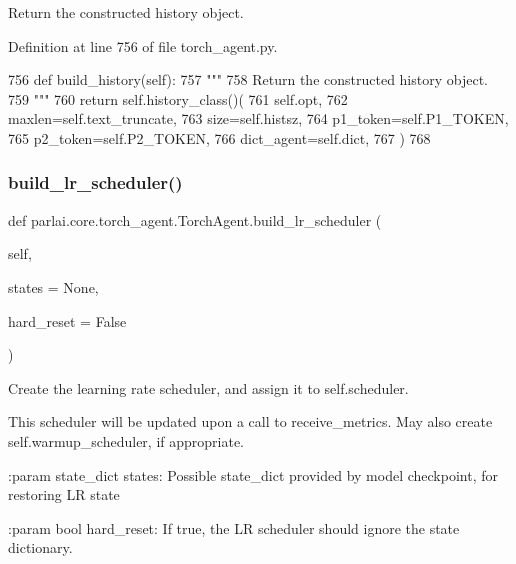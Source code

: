 \begin{DoxyVerb}Return the constructed history object.
\end{DoxyVerb}
 

Definition at line 756 of file torch\+\_\+agent.\+py.


\begin{DoxyCode}
756     \textcolor{keyword}{def }build\_history(self):
757         \textcolor{stringliteral}{"""}
758 \textcolor{stringliteral}{        Return the constructed history object.}
759 \textcolor{stringliteral}{        """}
760         \textcolor{keywordflow}{return} self.history\_class()(
761             self.opt,
762             maxlen=self.text\_truncate,
763             size=self.histsz,
764             p1\_token=self.P1\_TOKEN,
765             p2\_token=self.P2\_TOKEN,
766             dict\_agent=self.dict,
767         )
768 
\end{DoxyCode}
\mbox{\label{classparlai_1_1core_1_1torch__agent_1_1TorchAgent_aa51ac42dc34e3d2281a01cba78a96151}} 
\subsubsection{\texorpdfstring{build\+\_\+lr\+\_\+scheduler()}{build\_lr\_scheduler()}}
{\footnotesize\ttfamily def parlai.\+core.\+torch\+\_\+agent.\+Torch\+Agent.\+build\+\_\+lr\+\_\+scheduler (\begin{DoxyParamCaption}\item[{}]{self,  }\item[{}]{states = {\ttfamily None},  }\item[{}]{hard\+\_\+reset = {\ttfamily False} }\end{DoxyParamCaption})}

\begin{DoxyVerb}Create the learning rate scheduler, and assign it to self.scheduler.

This scheduler will be updated upon a call to receive_metrics.
May also create self.warmup_scheduler, if appropriate.

:param state_dict states: Possible state_dict provided by model
    checkpoint, for restoring LR state

:param bool hard_reset: If true, the LR scheduler should ignore the
    state dictionary.
\end{DoxyVerb}
 

